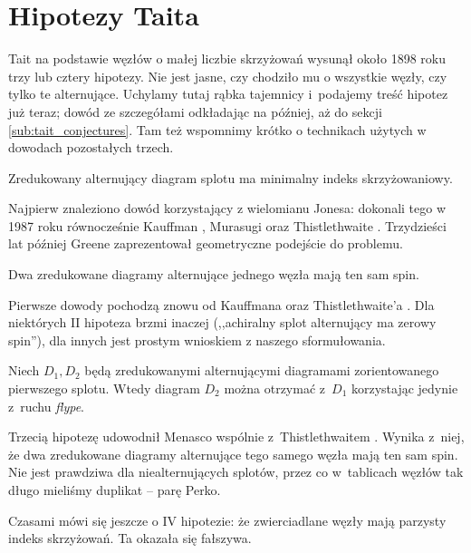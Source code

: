 
\section{Hipotezy Taita}
%

Tait na podstawie węzłów o małej liczbie skrzyżowań  wysunął około 1898 roku trzy lub cztery hipotezy.
Nie jest jasne, czy chodziło mu o wszystkie węzły, czy tylko te alternujące.
Uchylamy tutaj rąbka tajemnicy i~podajemy treść hipotez już teraz; dowód ze szczegółami odkładając na później, aż do sekcji \ref{sub:tait_conjectures}.
Tam też wspomnimy krótko o technikach użytych w dowodach pozostałych trzech.

\begin{conjecture}
%
\label{con:tait_1}%
    Zredukowany alternujący diagram splotu ma minimalny indeks skrzyżowaniowy.
\end{conjecture}

Najpierw znaleziono dowód korzystający z wielomianu Jonesa: dokonali tego w 1987 roku równocześnie Kauffman \cite{kauffman1987}, Murasugi \cite{murasugi1987} oraz Thistlethwaite \cite{thistlethwaite1987}.
%
%
%
Trzydzieści lat później Greene \cite{greene2017} zaprezentował geometryczne podejście do problemu.
%

\begin{conjecture}
%
    Dwa zredukowane diagramy alternujące jednego węzła mają ten sam spin.
\end{conjecture}

Pierwsze dowody pochodzą znowu od Kauffmana \cite{kauffman1987} oraz Thistlethwaite'a \cite{thistlethwaite1987}.
%
%
Dla niektórych II hipoteza brzmi inaczej (,,achiralny splot alternujący ma zerowy spin''), dla innych jest prostym wnioskiem z naszego sformułowania.

\begin{conjecture}
%
    Niech $D_1, D_2$ będą zredukowanymi alternującymi diagramami zorientowanego pierwszego splotu.
    Wtedy diagram $D_2$ można otrzymać z~$D_1$ korzystając jedynie z~ruchu \emph{flype}.
\end{conjecture}

Trzecią hipotezę udowodnił Menasco wspólnie z~Thistlethwaitem \cite{menasco1993}.
%
%
Wynika z~niej, że dwa zredukowane diagramy alternujące tego samego węzła mają ten sam spin.
Nie jest prawdziwa dla niealternujących splotów, przez co w~tablicach węzłów tak długo mieliśmy duplikat -- parę Perko.
%

Czasami mówi się jeszcze o IV hipotezie: że zwierciadlane węzły mają parzysty indeks skrzyżowań.
Ta okazała się fałszywa.

%


